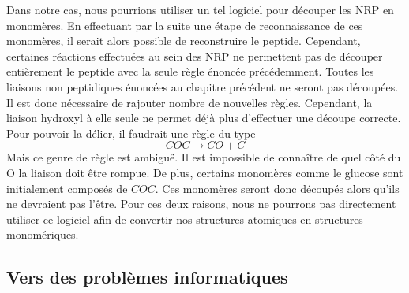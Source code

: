 Dans notre cas, nous pourrions utiliser un tel logiciel pour découper les NRP en monomères.
En effectuant par la suite une étape de reconnaissance de ces monomères, il serait alors possible de reconstruire le peptide.
Cependant, certaines réactions effectuées au sein des NRP ne permettent pas de découper entièrement le peptide avec la seule règle énoncée précédemment.
Toutes les liaisons non peptidiques énoncées au chapitre précédent ne seront pas découpées.
Il est donc nécessaire de rajouter nombre de nouvelles règles.
Cependant, la liaison hydroxyl à elle seule ne permet déjà plus d'effectuer une découpe correcte.
Pour pouvoir la délier, il faudrait une règle du type
\begin{equation}
  COC \longrightarrow CO + C
\end{equation}
Mais ce genre de règle est ambiguë.
Il est impossible de connaître de quel côté du O la liaison doit être rompue.
De plus, certains monomères comme le glucose sont initialement composés de $COC$.
Ces monomères seront donc découpés alors qu'ils ne devraient pas l'être.
Pour ces deux raisons, nous ne pourrons pas directement utiliser ce logiciel afin de convertir nos structures atomiques en structures monomériques.
% 
% 
% 




\subsection{Vers des problèmes informatiques}

